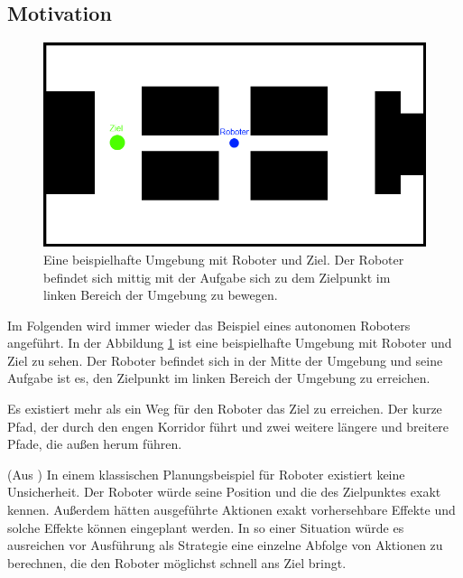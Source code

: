 \documentclass[a4paper]{IEEEtran}
\begin{document}
\subsection{Motivation}
\begin{figure}[ht]
	\centering
	\includegraphics[scale=0.42]{images/autnmRobot_basicSituation.png}
	\caption{Eine beispielhafte Umgebung mit Roboter und Ziel. Der Roboter befindet sich mittig mit der Aufgabe sich zu dem Zielpunkt im linken Bereich der Umgebung zu bewegen.}
	\label{fig:holoch_autnmRob_bSit}
\end{figure}
Im Folgenden wird immer wieder das Beispiel eines autonomen Roboters angeführt. In der Abbildung \ref{fig:holoch_autnmRob_bSit} ist eine beispielhafte Umgebung mit Roboter und Ziel zu sehen. Der Roboter befindet sich in der Mitte der Umgebung und seine Aufgabe ist es, den Zielpunkt im linken Bereich der Umgebung zu erreichen. 

Es existiert mehr als ein Weg für den Roboter das Ziel zu erreichen. Der kurze Pfad, der durch den engen Korridor führt und zwei weitere längere und breitere Pfade, die außen herum führen.

(Aus \cite{thrun2005probabilistic}) In einem klassischen Planungsbeispiel für Roboter existiert keine Unsicherheit. Der Roboter würde seine Position und die des Zielpunktes exakt kennen. Außerdem hätten ausgeführte Aktionen exakt vorhersehbare Effekte und solche Effekte können eingeplant werden. In so einer Situation würde es ausreichen vor Ausführung als Strategie eine einzelne Abfolge von Aktionen zu berechnen, die den Roboter möglichst schnell ans Ziel bringt.
\end{document}
